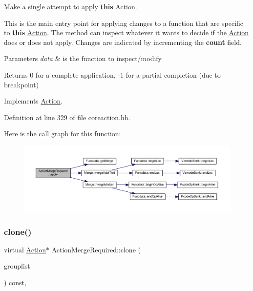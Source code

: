 Make a single attempt to apply {\bfseries{this}} \mbox{\hyperlink{class_action}{Action}}. 

This is the main entry point for applying changes to a function that are specific to {\bfseries{this}} \mbox{\hyperlink{class_action}{Action}}. The method can inspect whatever it wants to decide if the \mbox{\hyperlink{class_action}{Action}} does or does not apply. Changes are indicated by incrementing the {\bfseries{count}} field. 
\begin{DoxyParams}{Parameters}
{\em data} & is the function to inspect/modify \\
\hline
\end{DoxyParams}
\begin{DoxyReturn}{Returns}
0 for a complete application, -\/1 for a partial completion (due to breakpoint) 
\end{DoxyReturn}


Implements \mbox{\hyperlink{class_action_aac1c3999d6c685b15f5d9765a4d04173}{Action}}.



Definition at line 329 of file coreaction.\+hh.

Here is the call graph for this function\+:
\nopagebreak
\begin{figure}[H]
\begin{center}
\leavevmode
\includegraphics[width=350pt]{class_action_merge_required_a2cee2e5fc759fbf5ba680f08bfb4d0e3_cgraph}
\end{center}
\end{figure}
\mbox{\label{class_action_merge_required_ab7fa4212557a6a7d32f4f2eab26e08e9}} 
\subsubsection{\texorpdfstring{clone()}{clone()}}
{\footnotesize\ttfamily virtual \mbox{\hyperlink{class_action}{Action}}$\ast$ Action\+Merge\+Required\+::clone (\begin{DoxyParamCaption}\item[{const \mbox{\hyperlink{class_action_group_list}{Action\+Group\+List}} \&}]{grouplist }\end{DoxyParamCaption}) const\hspace{0.3cm}{\ttfamily [inline]}, {\ttfamily [virtual]}}



